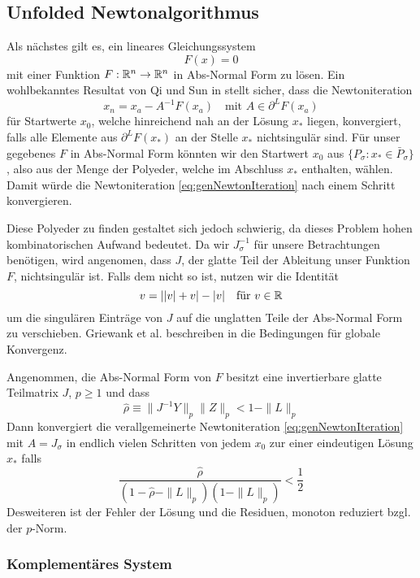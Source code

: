 \subsection{Unfolded Newtonalgorithmus}
Als nächstes gilt es, ein lineares Gleichungssystem 
\[
 F(x) = 0
\]
mit einer Funktion  $F:\mathbb{R}^n \to \mathbb{R}^n$ in Abs-Normal Form zu lösen.
Ein wohlbekanntes Resultat von Qi und Sun in \cite{qi1993nonsmooth} stellt sicher, dass die Newtoniteration
\begin{equation}
\label{eq:genNewtonIteration}
 x_n = x_a- A^{-1}F(x_a)\quad \text{mit } A \in \partial^LF(x_a)
\end{equation}
für Startwerte $x_0$, welche hinreichend nah an der Lösung $x_*$ liegen, konvergiert, falls alle Elemente aus $\partial^L F(x_*)$ an der Stelle $x_*$ nichtsingulär sind. 
Für unser gegebenes $F$ in Abs-Normal Form könnten wir den Startwert $x_0$ aus $\lbrace P_\sigma:x_*\in \bar P_\sigma \rbrace$, also aus der Menge der Polyeder, welche im Abschluss  $x_*$ enthalten, wählen. Damit würde die Newtoniteration \eqref{eq:genNewtonIteration} nach einem Schritt konvergieren. 

Diese Polyeder zu finden gestaltet sich jedoch schwierig, da dieses Problem hohen kombinatorischen Aufwand bedeutet. 
Da wir $J_\sigma^{-1}$ für unsere Betrachtungen benötigen, wird angenomen, dass $J$, der glatte Teil der Ableitung unser Funktion $F$, nichtsingulär ist. Falls dem nicht so ist, nutzen wir die Identität
\[
 v = | |v| + v| - |v | \quad \text{für } v\in\mathbb{R}
\]
um die singulären Einträge von $J$ auf die unglatten Teile der Abs-Normal Form zu verschieben.
Griewank et al. beschreiben in \cite[Prop.5.2]{plan} die Bedingungen für globale Konvergenz.

\begin{theorem}
 Angenommen, die Abs-Normal Form von $F$ besitzt eine invertierbare glatte Teilmatrix $J$, $p\geq 1$ und dass
 \[
  \hat \rho \equiv \| J^{-1}Y \|_p \|Z\|_p < 1 - \|L\|_p
 \]
 Dann konvergiert die verallgemeinerte Newtoniteration \eqref{eq:genNewtonIteration} mit $A=J_\sigma$ in endlich vielen Schritten von jedem $x_0$ zur einer eindeutigen Lösung $x_*$ falls
 \[
  \frac{\hat \rho}{(1-\hat \rho - \|L\|_p)(1-\|L\|_p)} < \frac{1}{2}
 \]
Desweiteren ist der Fehler der Lösung und die Residuen, monoton reduziert bzgl. der $p$-Norm.
\end{theorem}

\subsubsection{Komplementäres System}


